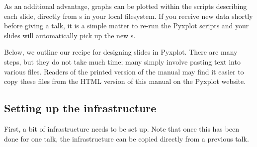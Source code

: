 As an additional advantage, graphs can be plotted within the scripts describing
each slide, directly from \datafile s in your local filesystem. If you receive
new data shortly before giving a talk, it is a simple matter to re-run the
Pyxplot scripts and your slides will automatically pick up the new \datafile s.

Below, we outline our recipe for designing slides in Pyxplot. There are many
steps, but they do not take much time; many simply involve pasting text into
various files. Readers of the printed version of the manual may find it easier
to copy these files from the HTML version of this manual on the Pyxplot
website.

\subsection{Setting up the infrastructure}

First, a bit of infrastructure needs to be set up. Note that once this has been
done for one talk, the infrastructure can be copied directly from a previous
talk.

